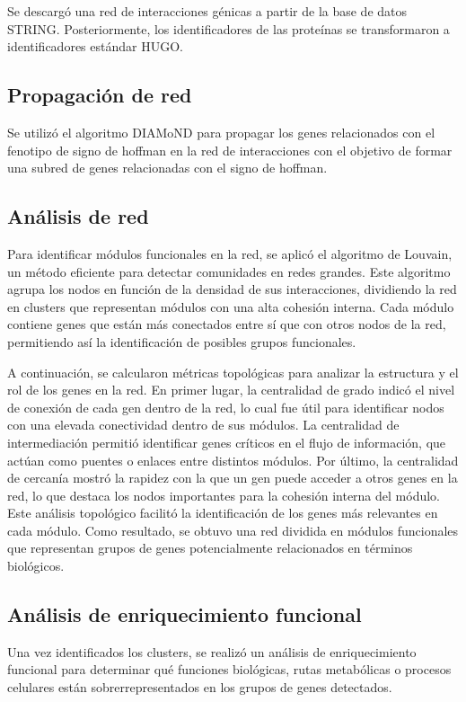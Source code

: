 Se descargó una red de interacciones génicas a partir de la base de datos STRING. Posteriormente, los identificadores de las proteínas se transformaron a identificadores estándar HUGO.

\subsection{Propagación de red}

Se utilizó el algoritmo DIAMoND para propagar los genes relacionados con el fenotipo de signo de hoffman en la red de interacciones con el objetivo de formar una subred de genes relacionadas con el signo de hoffman.

\subsection{Análisis de red}

Para identificar módulos funcionales en la red, se aplicó el algoritmo de Louvain, un método eficiente para detectar comunidades en redes grandes. Este algoritmo agrupa los nodos en función de la densidad de sus interacciones, dividiendo la red en clusters que representan módulos con una alta cohesión interna. Cada módulo contiene genes que están más conectados entre sí que con otros nodos de la red, permitiendo así la identificación de posibles grupos funcionales.

A continuación, se calcularon métricas topológicas para analizar la estructura y el rol de los genes en la red. En primer lugar, la centralidad de grado indicó el nivel de conexión de cada gen dentro de la red, lo cual fue útil para identificar nodos con una elevada conectividad dentro de sus módulos. La centralidad de intermediación permitió identificar genes críticos en el flujo de información, que actúan como puentes o enlaces entre distintos módulos. Por último, la centralidad de cercanía mostró la rapidez con la que un gen puede acceder a otros genes en la red, lo que destaca los nodos importantes para la cohesión interna del módulo.
\\

Este análisis topológico facilitó la identificación de los genes más relevantes en cada módulo. Como resultado, se obtuvo una red dividida en módulos funcionales que representan grupos de genes potencialmente relacionados en términos biológicos.


\subsection{Análisis de enriquecimiento funcional}

Una vez identificados los clusters, se realizó un análisis de enriquecimiento funcional para determinar qué funciones biológicas, rutas metabólicas o procesos celulares están sobrerrepresentados en los grupos de genes detectados.